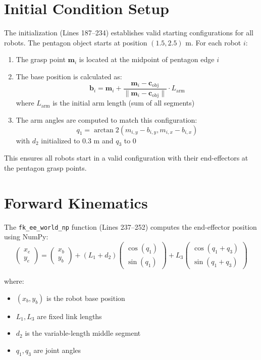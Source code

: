 \documentclass[12pt,a4paper]{article}
\begin{document}
\section{Initial Condition Setup}

The initialization (Lines 187--234) establishes valid starting configurations for all robots. The pentagon object starts at position $(1.5, 2.5)$ m. For each robot $i$:

\begin{enumerate}
    \item The grasp point $\mathbf{m}_i$ is located at the midpoint of pentagon edge $i$
    \item The base position is calculated as:
    \[
    \mathbf{b}_i = \mathbf{m}_i + \frac{\mathbf{m}_i - \mathbf{c}_{\text{obj}}}{\|\mathbf{m}_i - \mathbf{c}_{\text{obj}}\|} \cdot L_{\text{arm}}
    \]
    where $L_{\text{arm}}$ is the initial arm length (sum of all segments)
    
    \item The arm angles are computed to match this configuration:
    \[
    q_1 = \arctan2(m_{i,y} - b_{i,y}, m_{i,x} - b_{i,x})
    \]
    with $d_2$ initialized to 0.3 m and $q_3$ to 0
\end{enumerate}

This ensures all robots start in a valid configuration with their end-effectors at the pentagon grasp points.

\section{Forward Kinematics}

The \texttt{fk\_ee\_world\_np} function (Lines 237--252) computes the end-effector position using NumPy:
\[
\begin{pmatrix} x_e \\ y_e \end{pmatrix} = \begin{pmatrix} x_b \\ y_b \end{pmatrix} + (L_1 + d_2)\begin{pmatrix} \cos(q_1) \\ \sin(q_1) \end{pmatrix} + L_3\begin{pmatrix} \cos(q_1 + q_3) \\ \sin(q_1 + q_3) \end{pmatrix}
\]

where:
\begin{itemize}
    \item $(x_b, y_b)$ is the robot base position
    \item $L_1, L_3$ are fixed link lengths
    \item $d_2$ is the variable-length middle segment
    \item $q_1, q_3$ are joint angles
\end{itemize}
\end{document}

